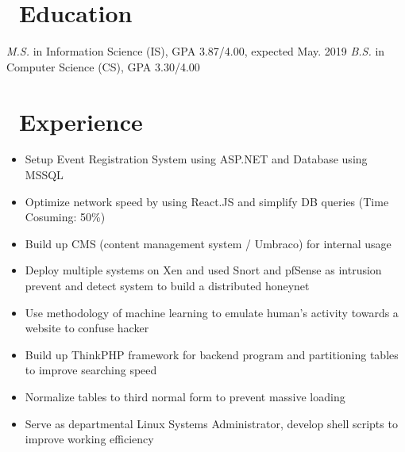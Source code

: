 \documentclass[8pt]{resume}
\begin{document}




\section{\faGraduationCap\ Education}
\textit{M.S.} in Information Science (IS), GPA 3.87/4.00, expected May. 2019
\textit{B.S.} in Computer Science (CS), GPA 3.30/4.00

\section{\faUsers\ Experience}
\begin{itemize}
  \item Setup Event Registration System using ASP.NET and Database using MSSQL 
  \item Optimize network speed by using React.JS and simplify DB queries (Time Cosuming: 50\%)
  \item Build up CMS (content management system / Umbraco) for internal usage 
\end{itemize}

\begin{itemize}
  \item Deploy multiple systems on Xen and used Snort and pfSense as intrusion prevent and detect system to build a distributed honeynet
  \item Use methodology of machine learning to emulate human's activity towards a website to confuse hacker
\end{itemize}

\begin{itemize}
  \item Build up ThinkPHP framework for backend program and partitioning tables to improve searching speed
  \item Normalize tables to third normal form to prevent massive loading 
  \item Serve as departmental Linux Systems Administrator, develop shell scripts to improve working efficiency
\end{itemize}
\end{document}
